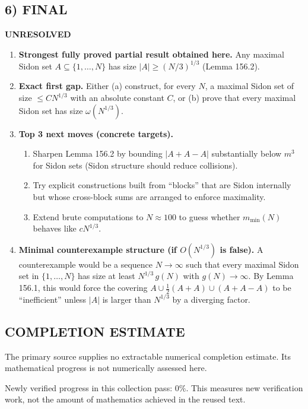 \subsection*{6) FINAL}
\textbf{UNRESOLVED}

\begin{enumerate}
\item[(i)] \textbf{Strongest fully proved partial result obtained here.}
Any maximal Sidon set $A\subseteq\{1,\dots,N\}$ has size $|A|\ge (N/3)^{1/3}$ (Lemma 156.2).

\item[(ii)] \textbf{Exact first gap.}
Either (a) construct, for every $N$, a maximal Sidon set of size $\le C N^{1/3}$ with an absolute constant $C$, or (b) prove that every maximal Sidon set has size $\omega(N^{1/3})$.

\item[(iii)] \textbf{Top 3 next moves (concrete targets).}
\begin{enumerate}
\item Sharpen Lemma 156.2 by bounding $|A+A-A|$ substantially below $m^3$ for Sidon sets (Sidon structure should reduce collisions).
\item Try explicit constructions built from ``blocks'' that are Sidon internally but whose cross-block sums are arranged to enforce maximality.
\item Extend brute computations to $N\approx 100$ to guess whether $m_{\min}(N)$ behaves like $c N^{1/3}$.
\end{enumerate}

\item[(iv)] \textbf{Minimal counterexample structure (if $O(N^{1/3})$ is false).}
A counterexample would be a sequence $N\to\infty$ such that every maximal Sidon set in $\{1,\dots,N\}$ has size at least $N^{1/3}\,g(N)$ with $g(N)\to\infty$. By Lemma 156.1, this would force the covering $A\cup \tfrac12(A+A)\cup(A+A-A)$ to be ``inefficient'' unless $|A|$ is larger than $N^{1/3}$ by a diverging factor.
\end{enumerate}




\subsection*{COMPLETION ESTIMATE}
The primary source supplies no extractable numerical completion estimate. Its mathematical progress is not numerically assessed here.

Newly verified progress in this collection pass: $0\%$. This measures new verification work, not the amount of mathematics achieved in the reused text.

